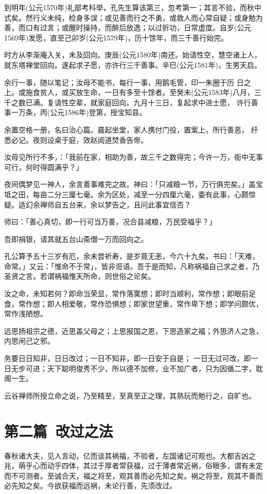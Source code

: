 \documentclass[12pt,twoside,openany]{book}
\begin{document}
到明年(公元1570年)礼部考科举，孔先生算该第三，忽考第一；其言不验，而秋中式矣。然行义未纯，检身多误；或见善而行之不勇，或救人而心常自疑；或身勉为善，而口有过言；或醒时操持，而醉后放逸；以过折功，日常虚度。自岁(公元1569年)发愿，直至己卯岁(公元1579年)，历十馀年，而三千善行始完。

时方从李渐庵入关，未及回向。庚辰(公元1580年)南还。始请性空，慧空诸上人，就东塔禅堂回向。遂起求子愿，亦许行三千善事。辛巳(公元1581年)，生男天启。

余行一事，随以笔记；汝母不能书，每行一事，用鹅毛管，印一朱圈于历 日之上。或施食贫人，或买放生命，一日有多至十馀者。至癸未(公元1583年)八月，三千之数已满。复请性空辈，就家庭回向。九月十三日，复起求中进士愿， 许行善事一万条，丙(公元1586年)登第，授宝知县。

余置空格一册，名曰治心篇。晨起坐堂，家人携付门役，置案上，所行善恶， 纤悉必记。夜则设桌于庭，效赵阅道焚香告帝。

汝母见所行不多，：「我前在家，相助为善，故三千之数得完；今许一万，衙中无事可行，何时得圆满乎？」

夜间偶梦见一神人，余言善事难完之故。神曰：「只减粮一节，万行俱完矣。」盖宝坻之田，每亩二分三厘七毫。余为区处，减至一分四厘六毫，委有此事，心颇惊疑。适幻余禅师自五台来，余以梦告之，且问此事宜信否？

师曰：「善心真切，即一行可当万善，况合县减粮，万民受福乎？」

吾即捐银，请其就五台山斋僧一万而回向之。

孔公算予五十三岁有厄，余未尝祈寿，是岁竟无恙，今六十九矣。书曰：「天难，命常。」又云：「惟命不于常」，皆非诳语。吾于是而知，凡称祸福自己求之者，乃圣贤之言。若谓祸福惟天所命，则世俗之论矣。

汝之命，未知若何？即命当荣显，常作落寞想；即时当顺利，常作想；即眼前足食，常作想；即人相爱敬，常作恐惧想；即家世望重，常作卑下想；即学问颇优，常作浅陋想。

远思扬祖宗之德，近思盖父母之；上思报国之恩，下思造家之福；外思济人之急，内思闲己之邪。

务要日日知非，日日改过；一日不知非，即一日安于自是； 一日无过可改，即一日无步可进；天下聪明俊秀不少，所以德不加修，业不加广者，只为因循二字，耽阁一生。

云谷禅师所授立命之说，乃至精至，至真至正之理，其熟玩而勉行之，自旷也。

\chapter{第二篇\ 改过之法}
春秋诸大夫，见人言动，亿而谈其祸福，不验者，左国诸记可观也。大都吉凶之兆，萌乎心而动乎四体，其过于厚者常获福，过于薄者常近祸，俗眼多，谓有未定而不可测者。至诚合天，福之将至，观其善而必先知之矣。祸之将至，观其不善而必先知之矣。今欲获福而远祸，未论行善，先须改过。
\end{document}
